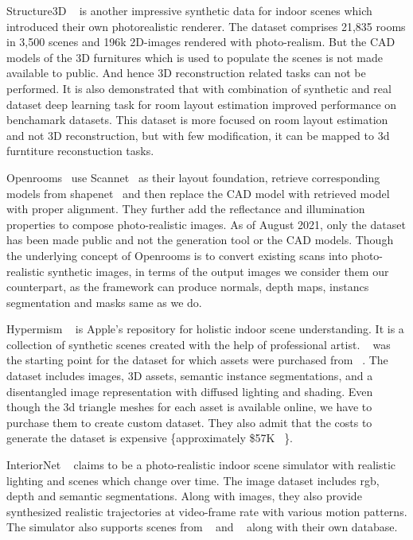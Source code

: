 Structure3D ~\cite{zheng2020structured3d} is another impressive synthetic data for indoor scenes which introduced their own photorealistic renderer.
The dataset comprises 21,835 rooms in 3,500 scenes and 196k 2D-images rendered with photo-realism.
But the CAD models of the 3D furnitures which is used to populate the scenes is not made available to public.
And hence 3D reconstruction related tasks can not be performed.
It is also demonstrated that with combination of synthetic and real dataset deep learning task for room layout estimation improved performance on benchamark datasets.
This dataset is more focused on room layout estimation and not 3D reconstruction, but with few modification, it can be mapped to 3d furntiture reconstuction tasks.

Openrooms~\cite{li2021openrooms} use Scannet~\cite{dai2017scannet} as their layout foundation, retrieve corresponding models from shapenet~\cite{chang2015shapenet}
and then replace the CAD model with retrieved model with proper alignment.
They further add the reflectance and illumination properties to compose photo-realistic images.
As of August 2021, only the dataset has been made public and not the generation tool or the CAD models.
Though the underlying concept of Openrooms is to convert existing scans into photo-realistic synthetic images, in terms of the output images we consider them our counterpart, as the framework can produce normals, depth maps, instancs segmentation and masks same as we do.

Hypermism ~\cite{Roberts2020HypersimAP} is Apple's repository for holistic indoor scene understanding.
It is a collection of synthetic scenes created with the help of professional artist.
~\cite{Evermotion} was the starting point for the dataset for which assets were purchased from ~\cite{TurboSquid}.
The dataset includes images, 3D assets, semantic instance segmentations, and a disentangled image representation with diffused lighting and shading.
Even though the 3d triangle meshes for each asset is available online, we have to purchase them to create custom dataset.
They also admit that the costs to generate the dataset is expensive \{approximately \$57K ~\cite{Roberts2020HypersimAP}\}.

InteriorNet ~\cite{InteriorNet18} claims to be a photo-realistic indoor scene simulator with realistic lighting and scenes which change over time.
The image dataset includes rgb, depth and semantic segmentations.
Along with images, they also provide synthesized realistic trajectories at video-frame rate with various motion patterns.
The simulator also supports scenes from ~\cite{McCormac:etal:ICCV2017} and ~\cite{Song2017SemanticSC} along with their own database.

